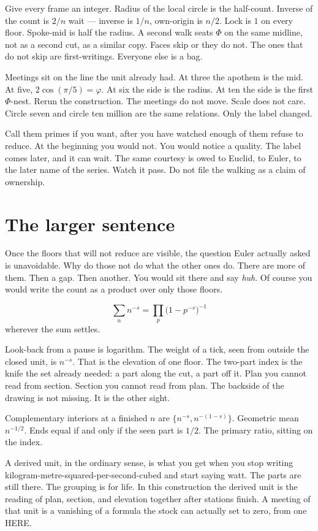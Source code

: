 \documentclass[11pt,a4paper]{article}
\begin{document}
Give every frame an integer.
Radius of the local circle is the half-count.
Inverse of the count is \(2/n\) wait --- inverse is \(1/n\), own-origin is \(n/2\).
Lock is \(1\) on every floor.
Spoke-mid is half the radius.
A second walk seats \(\Phi\) on the same midline, not as a second cut, as a similar copy.
Faces skip or they do not.
The ones that do not skip are first-writings.
Everyone else is a bag.

Meetings sit on the line the unit already had.
At three the apothem is the mid.
At five, \(2\cos(\pi/5)=\varphi\).
At six the side is the radius.
At ten the side is the first \(\Phi\)-nest.
Rerun the construction.
The meetings do not move.
Scale does not care.
Circle seven and circle ten million are the same relations.
Only the label changed.

Call them primes if you want, after you have watched enough of them refuse to reduce.
At the beginning you would not.
You would notice a quality.
The label comes later, and it can wait.
The same courtesy is owed to Euclid, to Euler, to the later name of the series.
Watch it pass.
Do not file the walking as a claim of ownership.

\section{The larger sentence}

Once the floors that will not reduce are visible, the question Euler actually asked is unavoidable.
Why do those not do what the other ones do.
There are more of them.
Then a gap.
Then another.
You would sit there and say \textit{huh}.
Of course you would write the count as a product over only those floors.

\[
\sum_n n^{-s}
=\prod_p\bigl(1-p^{-s}\bigr)^{-1}
\]
wherever the sum settles.

Look-back from a pause is logarithm.
The weight of a tick, seen from outside the closed unit, is \(n^{-s}\).
That is the elevation of one floor.
The two-part index is the knife the set already needed: a part along the cut, a part off it.
Plan you cannot read from section.
Section you cannot read from plan.
The backside of the drawing is not missing.
It is the other sight.

Complementary interiors at a finished \(n\) are \(\{n^{-s},n^{-(1-s)}\}\).
Geometric mean \(n^{-1/2}\).
Ends equal if and only if the seen part is \(1/2\).
The primary ratio, sitting on the index.

A derived unit, in the ordinary sense, is what you get when you stop writing kilogram-metre-squared-per-second-cubed and start saying watt.
The parts are still there.
The grouping is for life.
In this construction the derived unit is the reading of plan, section, and elevation together after stations finish.
A meeting of that unit is a vanishing of a formula the stock can actually set to zero, from one HERE.
\end{document}
